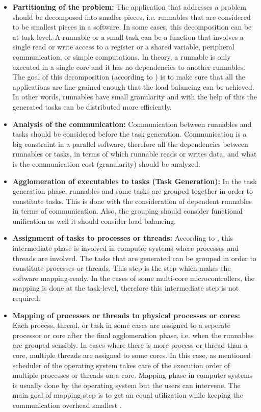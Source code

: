 \begin{itemize}
	\item \textbf{Partitioning of the problem:}
	The application that addresses a problem should be decomposed into smaller pieces, i.e. runnables that are considered to be smallest pieces in a software. In some cases, this decomposition can be at task-level. A runnable or a small task can be a function that involves a single read or write access to a register or a shared variable, peripheral communication, or simple computations. In theory, a runnable is only executed in a single core and it has no dependencies to another runnables. The goal of this decomposition (according to \cite{springerparallel}) is to make sure that all the applications are fine-grained enough that the load balancing can be achieved. In other words, runnables have small granularity and with the help of this the generated tasks can be distributed more efficiently.
	\item \textbf{Analysis of the communication:} Communication between runnables and tasks should be considered before the task generation. Communication is a big constraint in a parallel software, therefore all the dependencies between runnables or tasks, in terms of which runnable reads or writes data, and what is the communication cost (granularity) should be analyzed.
	\item \textbf{Agglomeration of executables to tasks (Task Generation):}
	In the task generation phase, runnables and some tasks are grouped together in order to constitute tasks. This is done with the consideration of dependent runnables in terms of communication. Also, the grouping should consider functional unification as well it should consider load balancing. 
	\item \textbf{Assignment of tasks to processes or threads:}
	According to \cite{springerparallel}, this intermediate phase is involved in computer systems where processes and threads are involved. The tasks that are generated can be grouped in order to constitute processes or threads. This step is the step which makes the software mapping-ready. In the cases of some multi-core microcontrollers, the mapping is done at the task-level, therefore this intermediate step is not required.
	\item \textbf{Mapping of processes or threads to physical processes or cores:}
	Each process, thread, or task in some cases are assigned to a seperate processor or core after the final agglomeration phase, i.e. when the runnables are grouped sensibly. In cases where there is more process or thread than a core, multiple threads are assigned to some cores. In this case, as mentioned scheduler of the operating system takes care of the execution order of multiple processes or threads on a core. Mapping phase in computer systems is usually done by the operating system but the users can intervene. The main goal of mapping step is to get an equal utilization while keeping the communication overhead smallest \cite{springerparallel} \cite{lukas1}.
\end{itemize}

